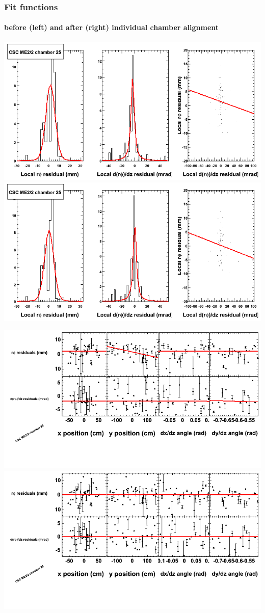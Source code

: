 \documentclass[compress]{beamer}
\begin{document}
\begin{frame}
\frametitle{Fit functions}
\framesubtitle{before (left) and after (right) individual chamber alignment}
\includegraphics[width=0.5\linewidth]{ringfits_3dof/beforefit_MEp22_25_bellcurve.png} \includegraphics[width=0.5\linewidth]{ringfits_3dof/afterfit_MEp22_25_bellcurve.png}

\includegraphics[width=0.5\linewidth]{ringfits_3dof/beforefit_MEp22_25_polynomials.png} \includegraphics[width=0.5\linewidth]{ringfits_3dof/afterfit_MEp22_25_polynomials.png}
\end{frame}
\end{document}
